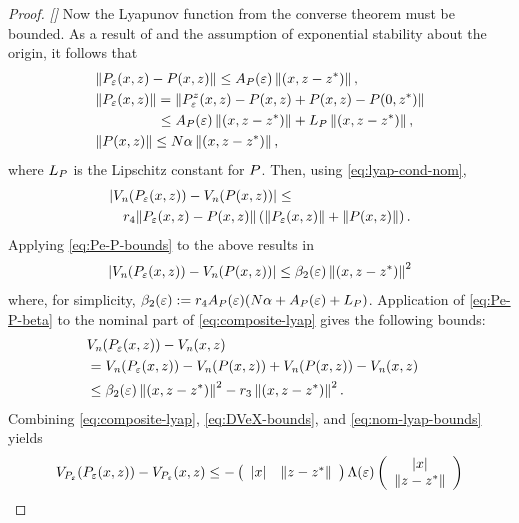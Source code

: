\begin{proof}{\em []}
  Now the Lyapunov function from the converse theorem must be bounded.
  As a result of  and the assumption of exponential stability about the origin, it follows that
  \begin{align}
    \label{eq:Pe-P-bounds}
    &\| \Pe\argsxz - \P\argsxz \| \leq \Ae \nzdxzst,\\
    \nonumber
    &\| \Pe\argsxz \| = \| \Pez\argsxz - \P\argsxz + \P\argsxz - \P\xzst\|\\
    \nonumber
    & \hspace{4.4em} \leq \Ae \nzdxzst  + \LP\nzdxzst,\\
    \nonumber
    &\| \P\argsxz \| \leq N \alpha \nzdxzst,
  \end{align}
  where $\LP$ is the Lipschitz constant for $\P$.
  Then, using \eqref{eq:lyap-cond-nom},
  \begin{align}
    \lefteqn{| \Vn(\Pe\argsxz) - \Vn(\P\argsxz) | \leq}\\
    \nonumber
    &&r_{4} \| \Pe\argsxz - \P\argsxz \| \left( \|\Pe\argsxz\| + \|\P\argsxz\| \right).
  \end{align}
  Applying \eqref{eq:Pe-P-bounds} to the above results in
  \begin{align}
    \label{eq:Pe-P-beta}
    | \Vn(\Pe\argsxz) - \Vn(\P\argsxz) | \leq \bepstwo \nzdxzst^{2}
  \end{align}
  where, for simplicity, $\bepstwo := r_{4} \Ae (N \alpha + \Ae  + \LP)$.
  Application of \eqref{eq:Pe-P-beta} to the nominal part of \eqref{eq:composite-lyap} gives the following bounds:
  \begin{align}
    \label{eq:nom-lyap-bounds}
    \lefteqn{\Vn(\Pe\argsxz) - \Vn\argsxz }\\
    \nonumber
    &= \Vn(\Pe\argsxz) - \Vn(\P\argsxz) + \Vn(\P\argsxz) - \Vn\argsxz\\
    \nonumber
    &\leq \bepstwo \nzdxzst^{2} - r_{3} \nzdxzst^{2}.
  \end{align}
  Combining \eqref{eq:composite-lyap}, \eqref{eq:DVeX-bounds}, and \eqref{eq:nom-lyap-bounds} yields
  \begin{align}
    \VP(\Pe\argsxz) - \VP\argsxz \leq - \left(\begin{array}{c c}
      \nzdx & \nzdzst
    \end{array}\right)
    \Le
    \left(\begin{array}{c}
      \nzdx\\
      \nzdzst
    \end{array}\right)

\end{align}
\end{proof}
